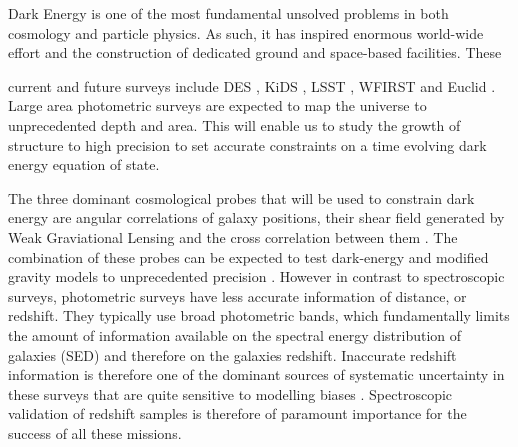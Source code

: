 \documentclass[oneside,11pt]{amsart}
\begin{document}
Dark Energy is {\color{magenta} one of the} most {\color{magenta} fundamental} unsolved problems in both
cosmology and particle physics.  As such, it has inspired enormous
world-wide effort and the construction of dedicated ground and
space-based facilities.  These {\color{magenta} current and future surveys include DES \citep[e.g.][]{2018ApJS..239...18A}, KiDS \citep[e.g.][]{2017MNRAS.465.1454H}, LSST \citep[e.g.][]{2018arXiv180901669T}, WFIRST \citep{2015arXiv150303757S}  and Euclid \citep[e.g.][]{2011arXiv1110.3193L}.  
Large area photometric surveys are expected to map the universe to unprecedented depth and area. This will enable us to study the growth of structure to high precision to set accurate constraints on a time evolving dark energy equation of state. 

The three dominant cosmological probes that will be used to constrain dark energy are angular correlations of galaxy positions, their shear field generated by Weak Graviational Lensing and the cross correlation between them \citep[e.g.][]{2015MNRAS.451.4424K}. The combination of these probes can be expected to test dark-energy and modified gravity models to unprecedented precision \citep{2006astro.ph..9591A}.
However in contrast to spectroscopic surveys, photometric surveys have less accurate information of distance, or redshift. They typically use broad photometric bands, which fundamentally limits the amount of information available on the spectral energy distribution of galaxies (SED) and therefore on the galaxies redshift. 
Inaccurate redshift information is therefore one of the dominant sources of systematic uncertainty in these surveys \citep{hemmati18} that are quite sensitive to modelling biases \citep{2018MNRAS.476..151E, 10.1093/mnras/sty2902}.
Spectroscopic validation of redshift samples is therefore of paramount importance for the success of all these missions. 

}
\end{document}
